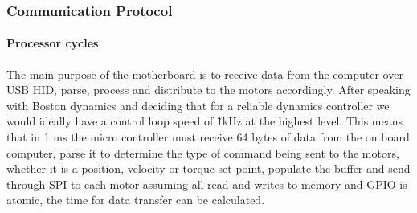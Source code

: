         \subsubsection{Communication Protocol}
            \paragraph{Processor cycles}
                The main purpose of the motherboard is to receive data from the computer over USB HID, parse, process and distribute to the motors accordingly. After speaking with Boston dynamics and deciding that for a reliable dynamics controller we would ideally have a control loop speed of \~ 1kHz at the highest level. This means that in 1 ms the micro controller must receive 64 bytes of data from the on board computer, parse it to determine the type of command being sent to the motors, whether it is a position, velocity or torque set point, populate the buffer and send through SPI to each motor assuming all read and writes to memory and GPIO is atomic, the time for data transfer can be calculated. \newline
